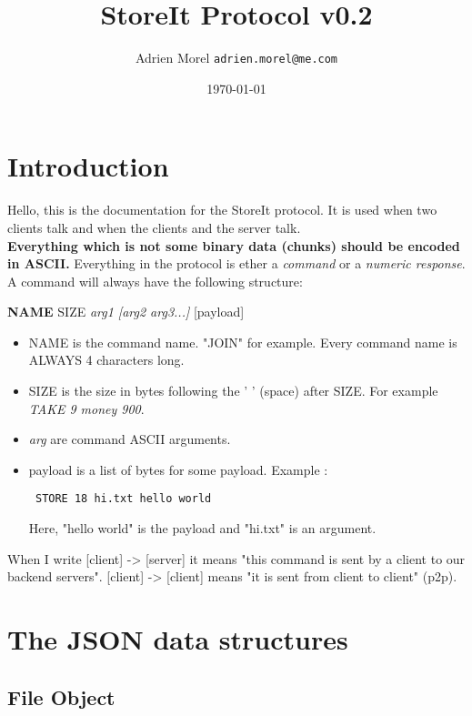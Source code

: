 \documentclass{article}
\begin{document}
  \title{StoreIt Protocol v0.2}
  \author{Adrien Morel \texttt{adrien.morel@me.com}}
  \date{\today}
  \maketitle

\section{Introduction}

Hello, this is the documentation for the StoreIt protocol. It is used when two clients talk and when the clients and the server talk.\\
\textbf{Everything which is not some binary data (chunks) should be encoded in ASCII.} Everything in the protocol is ether a \textit{command} or a \textit{numeric response}. A command will always have the following structure:\\
\begin{center}
\textbf{NAME} SIZE \textit{arg1 [arg2 arg3...]} [payload]
\end{center}

\begin{itemize}
  \item NAME is the command name. "JOIN" for example. Every command name is ALWAYS 4 characters long.
  \item SIZE is the size in bytes following the ' ' (space) after SIZE. For example \textit{TAKE 9 money 900}.
  \item \textit{arg} are command ASCII arguments.
  \item payload is a list of bytes for some payload. Example :\\
\begin{lstlisting}
 STORE 18 hi.txt hello world
\end{lstlisting}
Here, "hello world" is the payload and "hi.txt" is an argument.
\end{itemize}
When I write [client] -> [server] it means "this command is sent by a client to our backend servers". [client] -> [client] means "it is sent from client to client" (p2p).\\
\section{The JSON data structures}
\subsection{File Object}
\end{document}
